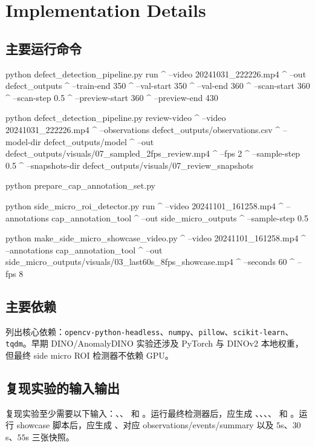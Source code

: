 \documentclass[a4paper,12pt]{article}
\newcommand{\code}[1]{\texttt{#1}}
\begin{document}
\section{Implementation Details}
\subsection{主要运行命令}
\begin{codeblock}
python defect_detection_pipeline.py run ^
  --video 20241031_222226.mp4 ^
  --out defect_outputs ^
  --train-end 350 ^
  --val-start 350 ^
  --val-end 360 ^
  --scan-start 360 ^
  --scan-step 0.5 ^
  --preview-start 360 ^
  --preview-end 430

python defect_detection_pipeline.py review-video ^
  --video 20241031_222226.mp4 ^
  --observations defect_outputs/observations.csv ^
  --model-dir defect_outputs/model ^
  --out defect_outputs/visuals/07_sampled_2fps_review.mp4 ^
  --fps 2 ^
  --sample-step 0.5 ^
  --snapshots-dir defect_outputs/visuals/07_review_snapshots

python prepare_cap_annotation_set.py

python side_micro_roi_detector.py run ^
  --video 20241101_161258.mp4 ^
  --annotations cap_annotation_tool ^
  --out side_micro_outputs ^
  --sample-step 0.5

python make_side_micro_showcase_video.py ^
  --video 20241101_161258.mp4 ^
  --annotations cap_annotation_tool ^
  --out side_micro_outputs/visuals/03_last60s_8fps_showcase.mp4 ^
  --seconds 60 ^
  --fps 8
\end{codeblock}

\subsection{主要依赖}
 列出核心依赖：\code{opencv-python-headless}、\code{numpy}、\code{pillow}、\code{scikit-learn}、\code{tqdm}。早期 DINO/AnomalyDINO 实验还涉及 PyTorch 与 DINOv2 本地权重，但最终 side micro ROI 检测器不依赖 GPU。

\subsection{复现实验的输入输出}
复现实验至少需要以下输入：、、 和 。运行最终检测器后，应生成 、、、、 和 。运行 showcase 脚本后，应生成 、对应 observations/events/summary 以及 $5$s、$30$s、$55$s 三张快照。
\end{document}
